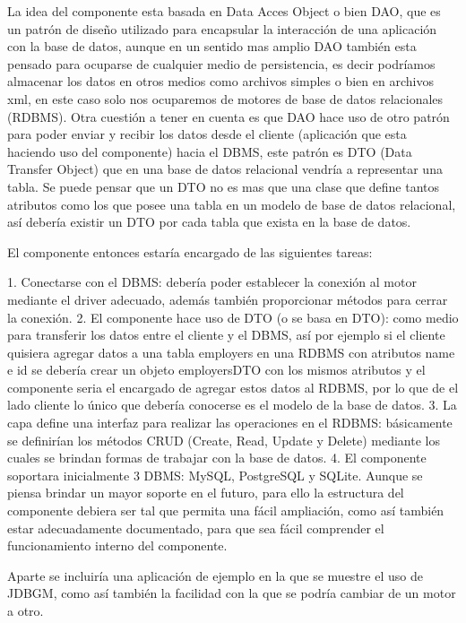 La idea del componente esta basada en Data Acces Object o bien DAO, que es un patrón de diseño utilizado para encapsular la interacción de una aplicación con la base de datos, aunque en un sentido mas amplio DAO también esta pensado para ocuparse de cualquier medio de persistencia, es decir podríamos almacenar los datos en otros medios como archivos simples o bien en archivos xml, en este caso solo nos ocuparemos de motores de base de datos relacionales (RDBMS). Otra cuestión a tener en cuenta es que DAO hace uso de otro patrón para poder enviar y recibir los datos desde el cliente (aplicación que esta haciendo uso del componente) hacia el DBMS, este patrón es DTO  (Data Transfer Object) que en una base de datos relacional vendría a representar una tabla. Se puede pensar que un DTO no es mas que una clase que define tantos atributos como los que posee una tabla en un  modelo de base de datos relacional, así debería existir un DTO por cada tabla que exista en la    base de datos. 

El componente entonces estaría encargado de las siguientes tareas:

1. Conectarse con el DBMS: debería poder establecer la conexión al motor mediante el driver adecuado, además también proporcionar métodos para cerrar la conexión.
2. El componente hace uso de DTO (o se basa en DTO): como medio para transferir los datos entre el cliente y el DBMS, así por ejemplo si el cliente quisiera agregar datos a una tabla employers en una RDBMS con atributos name e id se debería crear un objeto employersDTO con los mismos atributos y  el componente seria el encargado de agregar estos datos al RDBMS, por lo que de el lado cliente lo único que debería conocerse es el modelo de la base de datos.
3. La capa define una interfaz para realizar las operaciones en el RDBMS: básicamente se definirían los métodos CRUD (Create, Read, Update y Delete) mediante los cuales se brindan formas de trabajar con la base de datos.
4. El componente soportara inicialmente 3 DBMS: MySQL, PostgreSQL y SQLite. Aunque se piensa brindar un mayor soporte en el futuro, para ello la estructura del componente debiera ser tal que permita una fácil ampliación, como así también estar adecuadamente documentado, para que sea fácil comprender el funcionamiento interno del componente.

Aparte se incluiría una aplicación de ejemplo en la que se muestre el uso de JDBGM, como así también la facilidad con la que se podría cambiar de un motor a otro.  



